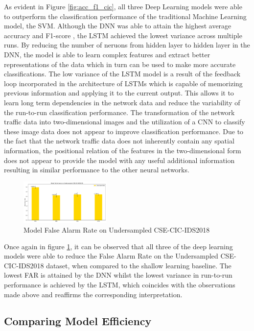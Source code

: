 \documentclass[conference]{IEEEtran}
\begin{document}
As evident in Figure \ref{fig:acc_f1_cic}, all three Deep Learning models were able to outperform the classification performance of the traditional Machine Learning model, the SVM. Although the DNN was able to attain the highest average accuracy and F1-score , the LSTM achieved the lowest variance across multiple runs. By reducing the number of neruons from hidden layer to hidden layer in the DNN, the model is able to learn complex features and extract better representations of the data which in turn can be used to make more accurate classifications. The low variance of the LSTM  model is a result of the feedback loop incorporated in the architecture of LSTMs which is capable of memorizing previous information and applying it to the current output. This allows it to learn long term dependencies in the network data and reduce the variability of the run-to-run classification performance. The transformation of the network traffic data into two-dimensional images and the utilization of a CNN to classify these image data does not appear to improve classification performance. Due to the fact that the network traffic data does not inherently contain any spatial information, the positional relation of the features in the two-dimensional form does not appear to provide the model with any useful additional information resulting in similar performance to the other neural networks.



\begin{figure}[htpb]
  \centering
  \includegraphics[width=0.4\textwidth]{images/far_cic.pdf}
  \caption{Model False Alarm Rate on Undersampled CSE-CIC-IDS2018}
  \label{fig:far_cic}
\end{figure}

Once again in figure \ref{fig:far_cic}, it can be observed that all three of the deep learning models were able to reduce the False Alarm Rate on the Undersampled CSE-CIC-IDS2018 dataset, when compared to the shallow learning baseline. The lowest FAR is attained by the DNN whilst the lowest variance in run-to-run performance is achieved by the LSTM, which coincides with the observations made above and reaffirms the corresponding interpretation. 

\subsection{Comparing Model Efficiency}
\end{document}
